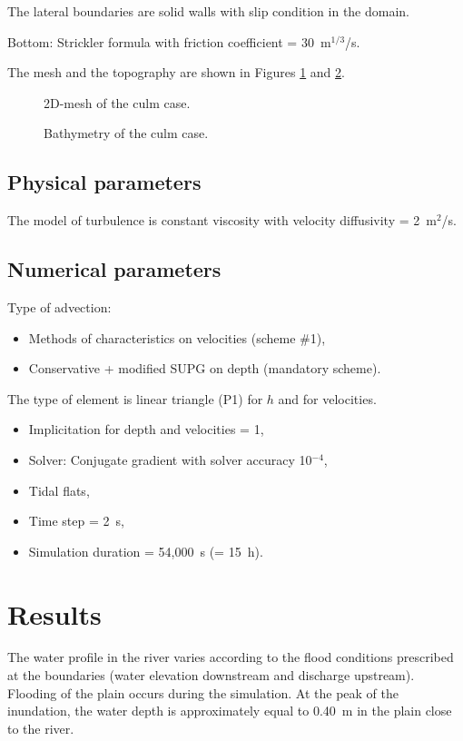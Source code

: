 The lateral boundaries are solid walls with slip condition in the domain.

Bottom: Strickler formula with friction coefficient = 30~m$^{1/3}$/s.

The mesh and the topography are shown in Figures \ref{fig:culm:Mesh} and \ref{fig:culm:Bathy}.
\begin{figure}[H]
 \centering
  \caption{2D-mesh of the culm case.}\label{fig:culm:Mesh}
\end{figure}


\begin{figure}[H]
 \centering
  \caption{Bathymetry of the culm case.}\label{fig:culm:Bathy}
\end{figure}

\subsection{Physical parameters}

The model of turbulence is constant viscosity
with velocity diffusivity = 2~m$^2$/s.

\subsection{Numerical parameters}
Type of advection:
\begin{itemize}
\item Methods of characteristics on velocities (scheme \#1),
\item Conservative + modified SUPG on depth (mandatory scheme).
\end{itemize}
The type of element is linear triangle (P1) for $h$ and for velocities.

\begin{itemize}
\item Implicitation for depth and velocities = 1,
\item Solver: Conjugate gradient with solver accuracy 10$^{-4}$,
\item Tidal flats,
\item Time step = 2~s,
\item Simulation duration = 54,000~s (= 15~h).
\end{itemize}

\section{Results}
The water profile in the river varies according to the flood conditions prescribed at the boundaries
(water elevation downstream and discharge upstream). Flooding of the plain occurs during
the simulation. At the peak of the inundation, the water depth is approximately equal to 0.40~m
in the plain close to the river.

